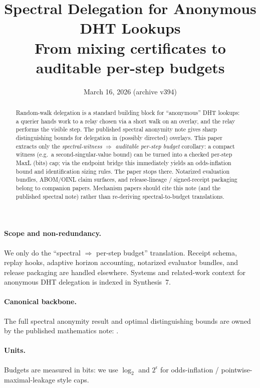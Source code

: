 \documentclass[11pt]{article}
\title{Spectral Delegation for Anonymous DHT Lookups\\
\large From mixing certificates to auditable per-step budgets}
\author{}
\date{March 16, 2026 (archive v394)}
\begin{document}
\maketitle

\begin{abstract}
Random-walk delegation is a standard building block for ``anonymous'' DHT lookups:
a querier hands work to a relay chosen via a short walk on an overlay, and the relay performs the visible step.
The published spectral anonymity note gives sharp distinguishing bounds for delegation in (possibly directed) overlays.
This paper extracts only the \emph{spectral-witness $\Rightarrow$ auditable per-step budget} corollary: a compact witness (e.g.\ a second-singular-value bound)
can be turned into a checked per-step MaxL (bits) cap; via the endpoint bridge this immediately yields an odds-inflation bound and identification sizing rules.\cite{series:endpointbridge}
The paper stops there.  Notarized evaluation bundles, ABOM/OINL claim surfaces, and release-lineage / signed-receipt packaging belong to companion papers.\cite{series:notcert,series:abomoinl,series:releaseA}
Mechanism papers should cite this note (and the published spectral note) rather than re-deriving spectral-to-budget translations.
\end{abstract}

\paragraph{Scope and non-redundancy.}
We only do the ``spectral $\Rightarrow$ per-step budget'' translation.
Receipt schema, replay hooks, adaptive horizon accounting, notarized evaluator bundles, and release packaging are handled elsewhere.\cite{series:receiptitems,series:condcert,series:accountingrulebook,series:notcert,series:abomoinl,series:releaseA}
Systems and related-work context for anonymous DHT delegation is indexed in Synthesis~7.\cite{series:relatedworkmap}

\paragraph{Canonical backbone.}
The full spectral anonymity result and optimal distinguishing bounds are owned by the published mathematics note:
.

\paragraph{Units.}
Budgets are measured in bits: we use $\log_2$ and $2^{\epsilon}$ for odds-inflation / pointwise-maximal-leakage style caps.\cite{series:notation}
\end{document}
